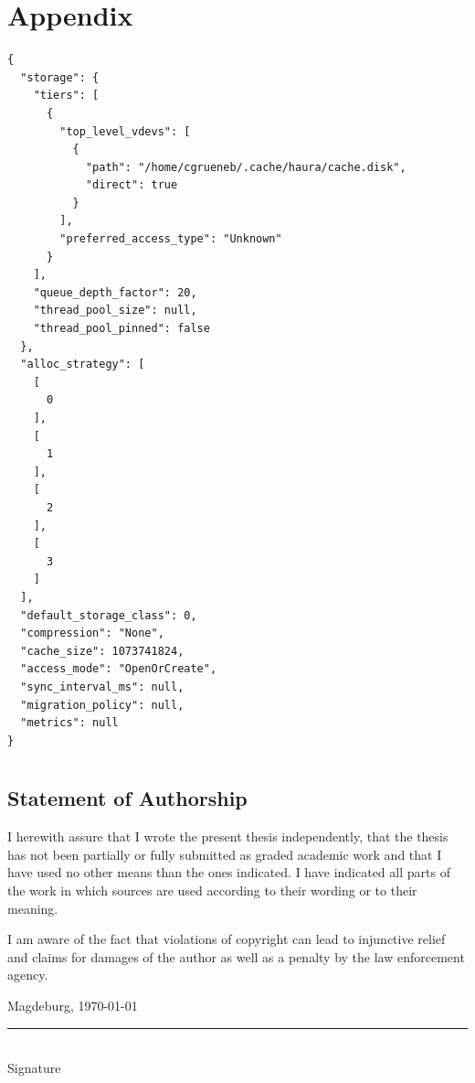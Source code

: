 \documentclass[
	12pt,
	a4paper,
	abstract,
	bibliography=totoc,
	chapterprefix,
	headings=openright,
	numbers=endperiod,
	parskip=half,
	twoside,
]{scrreprt}
\begin{document}





\appendix

\chapter{Appendix}
\label{cha:appendix}


\begin{lstlisting}[mathescape=true,caption=Haura configuration file for benchmark runs,label=lst:configuration haura]
{
  "storage": {
    "tiers": [
      {
        "top_level_vdevs": [
          {
            "path": "/home/cgrueneb/.cache/haura/cache.disk",
            "direct": true
          }
        ],
        "preferred_access_type": "Unknown"
      }
    ],
    "queue_depth_factor": 20,
    "thread_pool_size": null,
    "thread_pool_pinned": false
  },
  "alloc_strategy": [
    [
      0
    ],
    [
      1
    ],
    [
      2
    ],
    [
      3
    ]
  ],
  "default_storage_class": 0,
  "compression": "None",
  "cache_size": 1073741824,
  "access_mode": "OpenOrCreate",
  "sync_interval_ms": null,
  "migration_policy": null,
  "metrics": null
}

\end{lstlisting}




\chapter*{}

\section*{Statement of Authorship}

I herewith assure that I wrote the present thesis independently, that the thesis has not been partially or fully submitted as graded academic work and that I have used no other means than the ones indicated.
I have indicated all parts of the work in which sources are used according to their wording or to their meaning.

I am aware of the fact that violations of copyright can lead to injunctive relief and claims for damages of the author as well as a penalty by the law enforcement agency.

\bigskip

Magdeburg, \today

\bigskip
\bigskip

\rule{0.5\textwidth}{0.5pt}\\
\hspace*{0.25em}Signature
\end{document}
